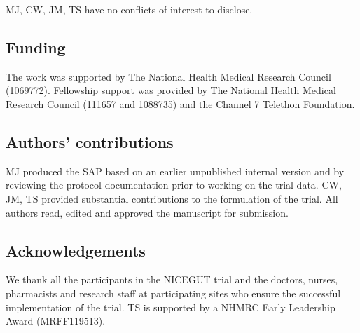 \documentclass[a4paper]{article}
\begin{document}
MJ, CW, JM, TS have no conflicts of interest to disclose.

\subsection{Funding}

The work was supported by The National Health Medical Research Council (1069772).
Fellowship support was provided by The National Health Medical Research Council (111657 and 1088735) and the Channel 7 Telethon Foundation.

\subsection{Authors' contributions}

MJ produced the SAP based on an earlier unpublished internal version and by reviewing the protocol documentation prior to working on the trial data.
CW, JM, TS provided substantial contributions to the formulation of the trial. 
All authors read, edited and approved the manuscript for submission.

\subsection{Acknowledgements}

We thank all the participants in the NICEGUT trial and the doctors, nurses, pharmacists and research staff at participating sites who ensure the successful implementation of the trial.
TS is supported by a NHMRC Early Leadership Award (MRFF119513). 

\appendix


\footnotesize~\vspace{-1.25cm}


\end{document}
